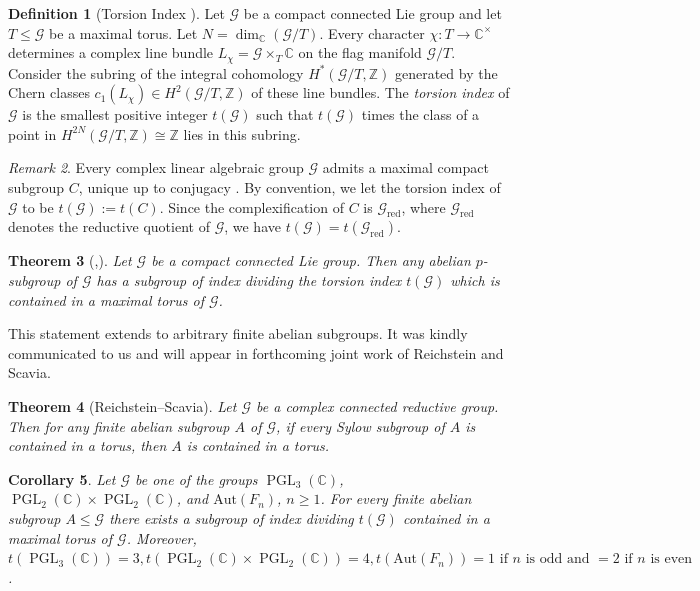 \documentclass[a4paper,12pt,oneside]{amsart}
\numberwithin{equation}{section}
\newtheorem{theorem}{Theorem}[section]
\newtheorem{corollary}[theorem]{Corollary}
\theoremstyle{definition}
\newtheorem{definition}[theorem]{Definition}
\theoremstyle{remark}
\newtheorem{remark}[theorem]{Remark}
\begin{document}
\begin{definition}[Torsion Index \cite{Grothendieck1958,totaro}]
Let $\mathcal{G}$ be a compact connected Lie group and let $T\leqslant \mathcal{G}$ be a maximal torus. Let $N=\dim_{\mathbb{C}}({\mathcal{G}}/T)$. Every character $\chi:T\to \mathbb{C}^{\times}$ determines a complex line bundle 
$L_{\chi}=\mathcal{G}\times_T \mathbb{C}$ on the flag manifold $\mathcal{G}/T$. Consider the subring of the integral cohomology $H^*(\mathcal{G}/T,\mathbb{Z})$ generated by the Chern classes $c_1(L_\chi)\in H^2(\mathcal{G}/T,\mathbb{Z})$ of these line bundles. The \emph{torsion index} of $\mathcal{G}$ is the smallest positive integer $t(\mathcal{G})$ such that $t(\mathcal{G})$ times the class of a point in $H^{2N}(\mathcal{G}/T,\mathbb{Z})\cong \mathbb{Z}$ lies in this subring.
\end{definition}

\begin{remark}
Every complex linear algebraic group $\mathcal{G}$ admits a maximal compact subgroup $C$, unique up to conjugacy \cite[Chapter XV Theorem 3.1]{hoch}. By convention, we let the torsion index of $\mathcal{G}$ to be $t(\mathcal{G}):=t(C)$. Since the complexification of \(C\) is \(\mathcal{G}_{\mathrm{red}}\), where \(\mathcal{G}_{\mathrm{red}}\) denotes the reductive quotient of \(\mathcal{G}\), we have \(t(\mathcal{G}) = t(\mathcal{G}_{\mathrm{red}})\).
\end{remark}

\begin{theorem}[{\cite[4.8]{reichstein}},{\cite[Theorem 1.2]{totaro}}]\label{pgroup}
Let $\mathcal{G}$ be a compact connected Lie group. Then any abelian $p$-subgroup of $\mathcal{G}$ has a subgroup of index dividing the torsion index $t(\mathcal{G})$ which is contained in a maximal torus of $\mathcal{G}$.
\end{theorem}

This statement extends to arbitrary finite abelian subgroups. It was kindly communicated to us and will appear in forthcoming joint work of Reichstein and Scavia. 

\begin{theorem}[Reichstein--Scavia]\label{abegroup}
Let $\mathcal{G}$ be a complex connected reductive group. Then for any finite abelian subgroup $A$ of $\mathcal{G}$, if every Sylow subgroup of $A$ is contained in a torus, then $A$ is contained in a torus.
\end{theorem}

\begin{corollary}\label{cor}
Let $\mathcal{G}$ be one of the groups $\operatorname{PGL}_3(\mathbb{C})$, $\operatorname{PGL}_2(\mathbb{C})\times\operatorname{PGL}_2(\mathbb{C})$, and $\mathrm{Aut}(F_n)$, $n\geq 1$. For every finite abelian subgroup $A\leqslant \mathcal{G}$ there exists a subgroup of index dividing $t(\mathcal{G})$ contained in a maximal torus of $\mathcal{G}$. Moreover, $t(\operatorname{PGL}_3(\mathbb{C}))=3, t(\operatorname{PGL}_2(\mathbb{C})\times\operatorname{PGL}_2(\mathbb{C})) = 4, t(\mathrm{Aut}(F_n))=1 \text{ if $n$ is odd and } = 2 \text{ if $n$ is even}$.
\end{corollary}
\end{document}
